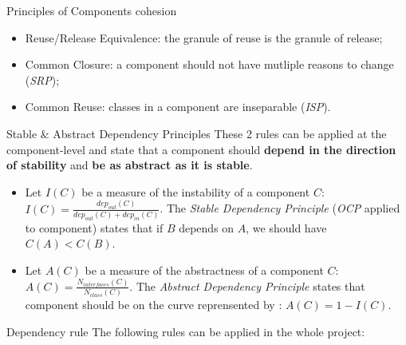 \documentclass[xcolor={table}]{beamer}
\begin{document}
\begin{frame}[fragile=singleslide,t]
\begin{columns}[onlytextwidth,T]
    \begin{column}{.47\textwidth}
      \begin{block}{Principles of Components cohesion}
        \begin{itemize}
          \item Reuse/Release Equivalence: the granule of reuse is the granule of release;
          \item Common Closure: a component should not have mutliple reasons to change (\textit{SRP});
          \item Common Reuse: classes in a component are inseparable (\textit{ISP}).
        \end{itemize}
      \end{block}


      \begin{block}{Stable \& Abstract Dependency Principles}
        These 2 rules can be applied at the component-level and state that a component should
        \textbf{depend in the direction of stability} and \textbf{be as abstract as it is stable}.
        \begin{itemize}
          \item Let $I(C)$ be a measure of the instability of a component $C$: $I(C)=\frac{dep_{out}(C)}{dep_{out}(C)+dep_{in}(C)}$. The \textit{Stable Dependency Principle} (\textit{OCP} applied to component) states that if $B$ depends on $A$, we should have $C(A) < C(B)$.  
          \item Let $A(C)$ be a measure of the abstractness of a component $C$: $A(C)=\frac{N_{interfaces}(C)}{N_{class}(C)}$. The \textit{Abstract Dependency Principle} states that component should be on the curve reprensented by : $A(C) = 1-I(C)$.
        \end{itemize}
      \end{block}


      \begin{block}{Dependency rule}
        The following rules can be applied in the whole project:
      \end{block}



\end{column}
\end{columns}
\end{frame}
\end{document}
